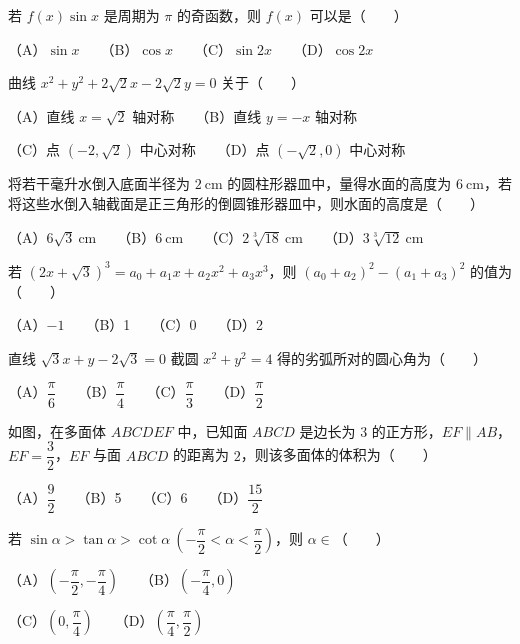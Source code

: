 \begin{question}
若 $f(x)\sin x$ 是周期为 $\pi$ 的奇函数，则 $f(x)$ 可以是\mbox{（　　）}

（A）$\sin x$　　（B）$\cos x$　　（C）$\sin2x$　　（D）$\cos2x$

\end{question}
\begin{question}
曲线 $x^2+y^2+2\sqrt2x-2\sqrt2y=0$ 关于\mbox{（　　）}

（A）直线 $x=\sqrt2$ 轴对称　　（B）直线 $y=-x$ 轴对称

（C）点 $(-2,\sqrt2)$ 中心对称　　（D）点 $(-\sqrt2,0)$ 中心对称

\end{question}
\begin{question}
将若干毫升水倒入底面半径为 $2\ \mathrm{cm}$ 的圆柱形器皿中，量得水面的高度为 $6\ \mathrm{cm}$，若将这些水倒入轴截面是正三角形的倒圆锥形器皿中，则水面的高度是\mbox{（　　）}

（A）$6\sqrt3\ \mathrm{cm}$　　（B）$6\ \mathrm{cm}$　　（C）$2\sqrt[3]{18}\ \mathrm{cm}$　　（D）$3\sqrt[3]{12}\ \mathrm{cm}$

\end{question}
\begin{question}
若 $(2x+\sqrt3)^3=a_0+a_1x+a_2x^2+a_3x^3$，则 $(a_0+a_2)^2-(a_1+a_3)^2$ 的值为\mbox{（　　）}

（A）$-1$　　（B）1　　（C）0　　（D）2

\end{question}
\begin{question}
直线 $\sqrt3x+y-2\sqrt3=0$ 截圆 $x^2+y^2=4$ 得的劣弧所对的圆心角为\mbox{（　　）}

（A）$\dfrac\pi6$　　（B）$\dfrac\pi4$　　（C）$\dfrac\pi3$　　（D）$\dfrac\pi2$

\Needspace{0.4\textheight}
\end{question}
\begin{question}
如图，在多面体 $ABCDEF$ 中，已知面 $ABCD$ 是边长为 $3$ 的正方形，$EF\parallel AB$，$EF=\dfrac32$，$EF$ 与面 $ABCD$ 的距离为 $2$，则该多面体的体积为\mbox{（　　）}
\nopagebreak[4]
\begin{center}\end{center}
\nopagebreak[4]
（A）$\dfrac92$　　（B）5　　（C）6　　（D）$\dfrac{15}2$

\end{question}
\begin{question}
若 $\sin\alpha>\tan\alpha>\cot\alpha\ \left(-\dfrac\pi2<\alpha<\dfrac\pi2\right)$，则 $\alpha\in$\mbox{（　　）}

（A）$\left(-\dfrac\pi2,-\dfrac\pi4\right)$　　（B）$\left(-\dfrac\pi4,0\right)$

（C）$\left(0,\dfrac\pi4\right)$　　（D）$\left(\dfrac\pi4,\dfrac\pi2\right)$

\end{question}
